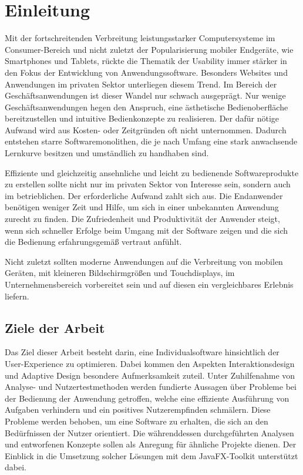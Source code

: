 \chapter{Einleitung}
Mit der fortschreitenden Verbreitung leistungsstarker Computersysteme im Consumer-Bereich und nicht zuletzt der Popularisierung mobiler Endgeräte, wie Smartphones und Tablets, rückte die Thematik der Usability immer stärker in den Fokus der Entwicklung von Anwendungssoftware. Besonders Websites und Anwendungen im privaten Sektor unterliegen diesem Trend. Im Bereich der Geschäftsanwendungen ist dieser Wandel nur schwach ausgeprägt. Nur wenige Geschäftsanwendungen hegen den Anspruch, eine ästhetische Bedienoberfläche bereitzustellen und intuitive Bedienkonzepte zu realisieren. Der dafür nötige Aufwand wird aus Kosten- oder Zeitgründen oft nicht unternommen. Dadurch entstehen starre Softwaremonolithen, die je nach Umfang eine stark anwachsende Lernkurve besitzen und umständlich zu handhaben sind.\par
Effiziente und gleichzeitig ansehnliche und leicht zu bedienende Softwareprodukte zu erstellen sollte nicht nur im privaten Sektor von Interesse sein, sondern auch im betrieblichen. Der erforderliche Aufwand zahlt sich aus. Die Endanwender benötigen weniger Zeit und Hilfe, um sich in einer unbekannten Anwendung zurecht zu finden. Die Zufriedenheit und Produktivität der Anwender steigt, wenn sich schneller Erfolge beim Umgang mit der Software zeigen und die sich die Bedienung erfahrungsgemäß vertraut anfühlt.\par
Nicht zuletzt sollten moderne Anwendungen auf die Verbreitung von mobilen Geräten, mit kleineren Bildschirmgrößen und Touchdisplays, im Unternehmensbereich vorbereitet sein und auf diesen ein vergleichbares Erlebnis liefern.\par
\section{Ziele der Arbeit} \label{sec:einlZiel}
Das Ziel dieser Arbeit besteht darin, eine Individualsoftware hinsichtlich der User-Experience zu optimieren. Dabei kommen den Aspekten Interaktionsdesign und Adaptive Design besondere Aufmerksamkeit zuteil. Unter Zuhilfenahme von Analyse- und Nutzertestmethoden werden fundierte Aussagen über Probleme bei der Bedienung der Anwendung getroffen, welche eine effiziente Ausführung von Aufgaben verhindern und ein positives Nutzerempfinden schmälern. Diese Probleme werden behoben, um eine Software zu erhalten, die sich an den Bedürfnissen der Nutzer orientiert. Die währenddessen durchgeführten Analysen und entworfenen Konzepte sollen als Anregung für ähnliche Projekte dienen. Der Einblick in die Umsetzung solcher Lösungen mit dem JavaFX-Toolkit unterstützt dabei.\par
